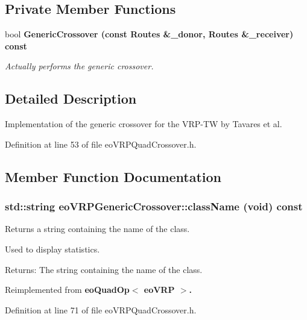 \subsection*{Private Member Functions}
\begin{CompactItemize}
\item 
bool \bf{Generic\-Crossover} (const Routes \&\_\-donor, Routes \&\_\-receiver) const 
\begin{CompactList}\small\item\em Actually performs the generic crossover. \item\end{CompactList}\end{CompactItemize}


\subsection{Detailed Description}
Implementation of the generic crossover for the VRP-TW by Tavares et al. 



Definition at line 53 of file eo\-VRPQuad\-Crossover.h.

\subsection{Member Function Documentation}
\subsubsection{\setlength{\rightskip}{0pt plus 5cm}std::string eo\-VRPGeneric\-Crossover::class\-Name (void) const\hspace{0.3cm}{\tt  [inline, virtual]}}\label{classeo_v_r_p_generic_crossover_7740db73b7151dab52df9d50f5366429}


Returns a string containing the name of the class. 

Used to display statistics. \begin{Desc}
\item[Returns:]The string containing the name of the class. \end{Desc}


Reimplemented from \bf{eo\-Quad\-Op$<$ eo\-VRP $>$}.

Definition at line 71 of file eo\-VRPQuad\-Crossover.h.
